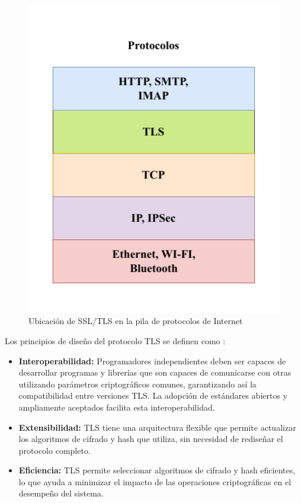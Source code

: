 \begin{figure}
    \centering
    \includegraphics[width=0.5\linewidth]{Imagenes/Seguridad de las comunicaciones/TCP_IP-TLS.pdf}
    \caption{Ubicación de SSL/TLS en la pila de protocolos de Internet}
    \label{fig:tcp_ip-tls}
\end{figure}

Los principios de diseño del protocolo TLS se definen como \cite{ristic2014bulletproof}:
\begin{itemize}
    \item \textbf{Interoperabilidad: }Programadores independientes deben ser capaces de desarrollar programas y librerías que son capaces de comunicarse con otras utilizando parámetros criptográficos comunes, garantizando así la compatibilidad entre versiones TLS. La adopción de estándares abiertos y ampliamente aceptados facilita esta interoperabilidad.
    
    \item \textbf{Extensibilidad: }TLS tiene una arquitectura flexible que permite actualizar los algoritmos de cifrado y hash que utiliza, sin necesidad de rediseñar el protocolo completo.

    \item \textbf{Eficiencia: }TLS permite seleccionar algoritmos de cifrado y hash eficientes, lo que ayuda a minimizar el impacto de las operaciones criptográficas en el desempeño del sistema.

\end{itemize}

